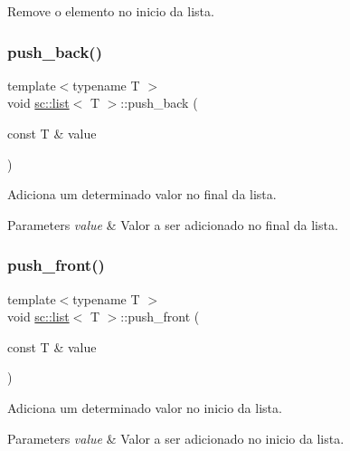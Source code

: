 Remove o elemento no inicio da lista. \mbox{\label{classsc_1_1list_a1d77cdaeacca7959989873617a753c96}} 
\subsubsection{\texorpdfstring{push\+\_\+back()}{push\_back()}}
{\footnotesize\ttfamily template$<$typename T $>$ \\
void \hyperlink{classsc_1_1list}{sc\+::list}$<$ T $>$\+::push\+\_\+back (\begin{DoxyParamCaption}\item[{const T \&}]{value }\end{DoxyParamCaption})\hspace{0.3cm}{\ttfamily [inline]}}

Adiciona um determinado valor no final da lista. 
\begin{DoxyParams}{Parameters}
{\em value} & Valor a ser adicionado no final da lista. \\
\hline
\end{DoxyParams}
\mbox{\label{classsc_1_1list_a24a7b8a81765dfe0351ddb263bc6d754}} 
\subsubsection{\texorpdfstring{push\+\_\+front()}{push\_front()}}
{\footnotesize\ttfamily template$<$typename T $>$ \\
void \hyperlink{classsc_1_1list}{sc\+::list}$<$ T $>$\+::push\+\_\+front (\begin{DoxyParamCaption}\item[{const T \&}]{value }\end{DoxyParamCaption})\hspace{0.3cm}{\ttfamily [inline]}}

Adiciona um determinado valor no inicio da lista. 
\begin{DoxyParams}{Parameters}
{\em value} & Valor a ser adicionado no inicio da lista. \\
\hline
\end{DoxyParams}
\mbox{\label{classsc_1_1list_a0fe585f3f9e33058294c3a590c7bfdea}} 
